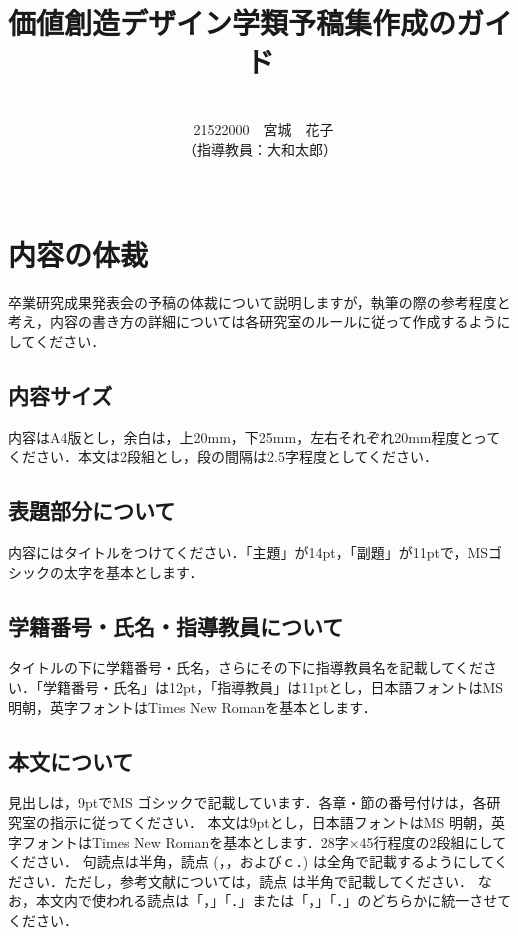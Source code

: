 \documentclass[paper=a4paper,jafontsize=9pt,twocolumn,number_oflines=45,line_length=28zw]{myuarticle}
\begin{document}
\title{{\Large\bfseries\gtfamily 価値創造デザイン学類予稿集作成のガイド}}
\author{\\\ 21522000　宮城　花子 \\（指導教員：大和太郎）\\ \\}
\date{}
\maketitle

\section{内容の体裁}
卒業研究成果発表会の予稿の体裁について説明しますが，執筆の際の参考程度と考え，内容の書き方の詳細については各研究室のルールに従って作成するようにしてください．

\subsection{内容サイズ}
内容はA4版とし，余白は，上20mm，下25mm，左右それぞれ20mm程度とってください．本文は2段組とし，段の間隔は2.5字程度としてください．

\subsection{表題部分について}
内容にはタイトルをつけてください．「主題」が14pt，「副題」が11ptで，MSゴシックの太字を基本とします．

\subsection{学籍番号・氏名・指導教員について}
タイトルの下に学籍番号・氏名，さらにその下に指導教員名を記載してください．「学籍番号・氏名」は12pt，「指導教員」は11ptとし，日本語フォントはMS 明朝，英字フォントはTimes New Romanを基本とします．

\subsection{本文について}
見出しは，9ptでMS ゴシックで記載しています．各章・節の番号付けは，各研究室の指示に従ってください．
本文は9ptとし，日本語フォントはMS 明朝，英字フォントはTimes New Romanを基本とします．28字×45行程度の2段組にしてください．
句読点は半角，読点 (，，およびｃ．) は全角で記載するようにしてください．ただし，参考文献については，読点 は半角で記載してください．
なお，本文内で使われる読点は「，」「．」または「，」「．」のどちらかに統一させてください．
\end{document}
